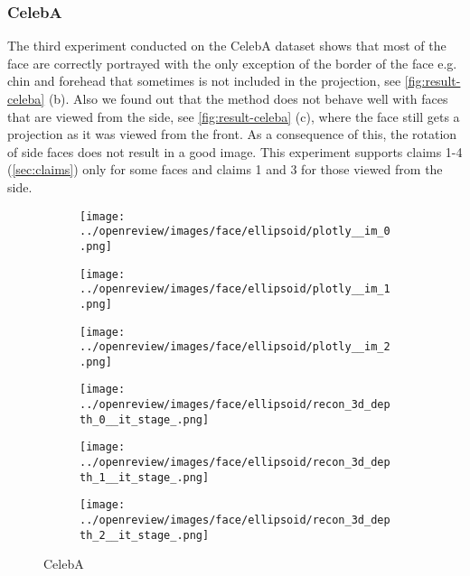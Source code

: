 \subsubsection{CelebA}

The third experiment conducted on the CelebA dataset shows that most of the face are correctly portrayed with the only exception of the border of the face e.g. chin and forehead that sometimes is not included in the projection, see \autoref{fig:result-celeba} (b). Also we found out that the method does not behave well with faces that are viewed from the side, see \autoref{fig:result-celeba} (c), where the face still gets a projection as it was viewed from the front. As a consequence of this, the rotation of side faces does not result in a good image. This experiment supports claims 1-4 (\autoref{sec:claims}) only for some faces and claims 1 and 3 for those viewed from the side.
\begin{figure}[h]
    \begin{subfigure}{0.33\textwidth}
        \centering
        \texttt{[image: ../openreview/images/face/ellipsoid/plotly\_\_im\_0.png]}
    \end{subfigure}
    \begin{subfigure}{0.33\textwidth}
        \centering
        \texttt{[image: ../openreview/images/face/ellipsoid/plotly\_\_im\_1.png]}
    \end{subfigure}
    \begin{subfigure}{0.33\textwidth}
        \centering
        \texttt{[image: ../openreview/images/face/ellipsoid/plotly\_\_im\_2.png]}
    \end{subfigure}
    \begin{subfigure}{0.33\textwidth}
        \centering
        \texttt{[image: ../openreview/images/face/ellipsoid/recon\_3d\_depth\_0\_\_it\_stage\_.png]}
        \caption{}
    \end{subfigure}
    \begin{subfigure}{0.33\textwidth}
        \centering
        \texttt{[image: ../openreview/images/face/ellipsoid/recon\_3d\_depth\_1\_\_it\_stage\_.png]}
        \caption{}
    \end{subfigure}
    \begin{subfigure}{0.33\textwidth}
        \centering
        \texttt{[image: ../openreview/images/face/ellipsoid/recon\_3d\_depth\_2\_\_it\_stage\_.png]}
        \caption{}
    \end{subfigure}
    \caption{CelebA}
    \label{fig:result-celeba}
\end{figure}
